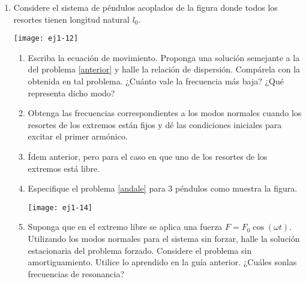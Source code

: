 \documentclass[11pt,spanish,a4paper]{article}
\begin{document}
\begin{enumerate}
\item
\begin{minipage}[t][2cm]{0.6\textwidth}
 Considere el sistema de péndulos acoplados de la figura donde todos los resortes tienen longitud natural $l_0$. 
\end{minipage}
\begin{minipage}[c][2cm][t]{0.35\textwidth}
  \texttt{[image: ej1-12]}
\end{minipage}
\begin{enumerate}
	\item Escriba la ecuación de movimiento.
	Proponga una solución semejante a la del problema \ref{anterior} y halle la relación de dispersión.
	Compárela con la obtenida en tal problema.
	¿Cuánto vale la frecuencia más baja?
	¿Qué representa dicho modo? 
	\item Obtenga las frecuencias correspondientes a los modos normales cuando los resortes de los extremos están fijos y dé las condiciones iniciales para excitar el primer armónico. 
	\item \label{andale} Ídem anterior, pero para el caso en que uno de los resortes de los extremos está libre.
	\item 
	\begin{minipage}[t][1.6cm]{0.7\textwidth}
	Especifique el problema \ref{andale} para 3 péndulos como muestra la figura.
	\end{minipage}
	\begin{minipage}[c][2cm][t]{0.2\textwidth}
  	\texttt{[image: ej1-14]}
	\end{minipage}
	\item Suponga que en el extremo libre se aplica una fuerza \(F = F_0 \cos(\omega t)\).
	Utilizando los modos normales para el sistema sin forzar, halle la solución estacionaria del problema forzado. Considere el problema sin amortiguamiento. Utilice lo aprendido en la guía anterior.
	¿Cuáles sonlas frecuencias de resonancia?
\end{enumerate}



\end{enumerate}
\end{document}
